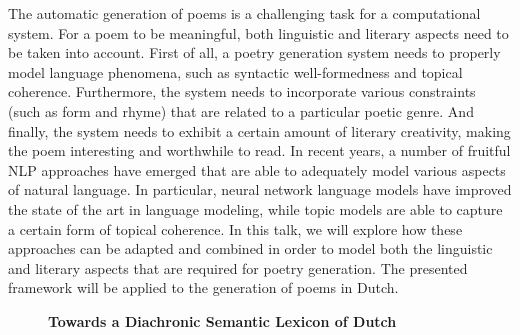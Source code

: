 \documentclass[10pt, a4paper, twopage, headinclude, footinclude, BCOR5mm]{scrartcl}
\begin{document}
{{\begin{table}[t!]
{\begin{tabular}{c}
    \end{tabular} }
    \end{table}

\noindent
The automatic generation of poems is a challenging task for a computational system. For a poem to be meaningful, both linguistic and literary aspects need to be taken into account. First of all, a poetry generation system needs to properly model language phenomena, such as syntactic well-formedness and topical coherence. Furthermore, the system needs to incorporate various constraints (such as form and rhyme) that are related to a particular poetic genre. And finally, the system needs to exhibit a certain amount of literary creativity, making the poem interesting and worthwhile to read.  In recent years, a number of fruitful NLP approaches have emerged that are able to adequately model various aspects of natural language. In particular, neural network language models have improved the state of the art in language modeling, while topic models are able to capture a certain form of topical coherence. In this talk, we will explore how these approaches can be adapted and combined in order to model both the linguistic and literary aspects that are required for poetry generation. The presented framework will be applied to the generation of poems in Dutch. 


\newpage

\begin{figure}[t!]
\centering
\large\textbf{Towards a Diachronic Semantic Lexicon of Dutch}
\vspace*{0.5cm}
\end{figure}


        \begin{table}[t!]
    \end{table}

}}
\end{document}
